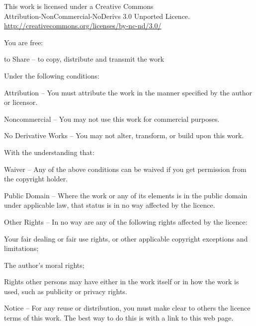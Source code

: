 
\thispagestyle{plain}

{%
\smaller\setlength{\parindent}{0pt}%
\raggedright\label{copyright-details}
\setlength{\parskip}{5pt}
{\centering

{\large\ccbyncnd}

This work is licensed under a Creative Commons\\
Attribution-NonCommercial-NoDerivs 3.0 Unported Licence.\\
\href{http://creativecommons.org/licenses/by-nc-nd/3.0/}{http://creativecommons.org/licenses/by-nc-nd/3.0/}

}

You are free:
\begin{packeditemize}
  \item to Share -- to copy, distribute and transmit the work
\end{packeditemize}


Under the following conditions:

\begin{packeditemize}
\item Attribution -- You must attribute the work in the manner specified by the author or licensor.
\item Noncommercial -- You may not use this work for commercial purposes.
\item No Derivative Works -- You may not alter, transform, or build upon this work.
\end{packeditemize}

With the understanding that:

\begin{packeditemize}
    \item Waiver -- Any of the above conditions can be waived if you get permission from the copyright holder.
    \item Public Domain -- Where the work or any of its elements is in the public domain under applicable law, that status is in no way affected by the licence.
    \item Other Rights -- In no way are any of the following rights affected by the licence:
        \begin{packeditemize}
            \item Your fair dealing or fair use rights, or other applicable copyright exceptions and limitations;
            \item The author's moral rights;
            \item Rights other persons may have either in the work itself or in how the work is used, such as publicity or privacy rights.
        \end{packeditemize}
    \item Notice -- For any reuse or distribution, you must make clear to others the licence terms of this work. The best way to do this is with a link to this web page.
\end{packeditemize}

}
